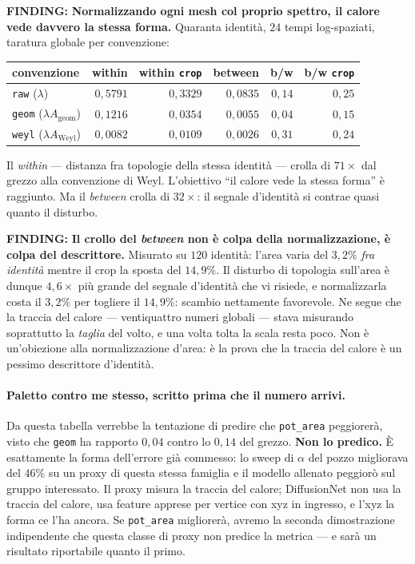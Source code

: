 \documentclass[11pt,a4paper]{article}
\newcommand{\finding}[1]{\textcolor{finding}{\textbf{FINDING:}} #1}
\begin{document}
\finding{\textbf{Normalizzando ogni mesh col proprio spettro, il calore vede davvero la stessa
forma.} Quaranta identit\`a, $24$ tempi log-spaziati, taratura globale per convenzione:}

\begin{center}\small
\begin{tabular}{lrrrrr}
\toprule
convenzione & within & within \texttt{crop} & between & b/w & b/w \texttt{crop} \\
\midrule
\texttt{raw}  ($\lambda$)                       & $0{,}5791$ & $0{,}3329$ & $0{,}0835$ & $0{,}14$ & $0{,}25$ \\
\texttt{geom} ($\lambda A_{\mathrm{geom}}$)     & $0{,}1216$ & $0{,}0354$ & $0{,}0055$ & $0{,}04$ & $0{,}15$ \\
\texttt{weyl} ($\lambda A_{\mathrm{Weyl}}$)     & $0{,}0082$ & $0{,}0109$ & $0{,}0026$ & $0{,}31$ & $0{,}24$ \\
\bottomrule
\end{tabular}
\end{center}

Il \emph{within} --- distanza fra topologie della stessa identit\`a --- crolla di $71\times$ dal
grezzo alla convenzione di Weyl. L'obiettivo ``il calore vede la stessa forma'' \`e raggiunto.
Ma il \emph{between} crolla di $32\times$: il segnale d'identit\`a si contrae quasi quanto il
disturbo.

\finding{\textbf{Il crollo del \emph{between} non \`e colpa della normalizzazione, \`e colpa del
descrittore.} Misurato su $120$ identit\`a: l'area varia del $3{,}2\%$ \emph{fra identit\`a}
mentre il crop la sposta del $14{,}9\%$. Il disturbo di topologia sull'area \`e dunque
$4{,}6\times$ pi\`u grande del segnale d'identit\`a che vi risiede, e normalizzarla costa il
$3{,}2\%$ per togliere il $14{,}9\%$: scambio nettamente favorevole. Ne segue che la traccia del
calore --- ventiquattro numeri globali --- stava misurando soprattutto la \emph{taglia} del
volto, e una volta tolta la scala resta poco. Non \`e un'obiezione alla normalizzazione d'area:
\`e la prova che la traccia del calore \`e un pessimo descrittore d'identit\`a.}

\paragraph{Paletto contro me stesso, scritto prima che il numero arrivi.} Da questa tabella
verrebbe la tentazione di predire che \texttt{pot\_area} peggiorer\`a, visto che \texttt{geom}
ha rapporto $0{,}04$ contro lo $0{,}14$ del grezzo. \textbf{Non lo predico.} \`E esattamente la
forma dell'errore gi\`a commesso: lo sweep di $\alpha$ del pozzo migliorava del $46\%$ su un
proxy di questa stessa famiglia e il modello allenato peggior\`o sul gruppo interessato. Il proxy
misura la traccia del calore; DiffusionNet non usa la traccia del calore, usa feature apprese per
vertice con xyz in ingresso, e l'xyz la forma ce l'ha ancora. Se \texttt{pot\_area} migliorer\`a,
avremo la seconda dimostrazione indipendente che questa classe di proxy non predice la metrica ---
e sar\`a un risultato riportabile quanto il primo.
\end{document}
